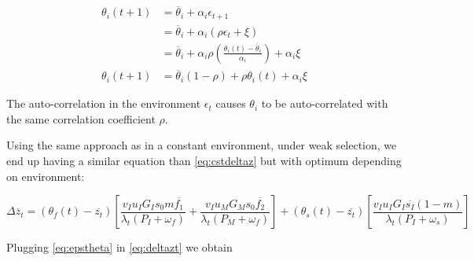 \begin{align}
	\theta_{i}(t+1) &= \overline{\theta}_{i} + \alpha_{i}\epsilon_{t+1} \nonumber \\
	&= \overline{\theta}_{i} + \alpha_{i}(\rho\epsilon_{t} + \xi) \nonumber \\
	&= \overline{\theta}_{i} + \alpha_{i}\rho(\frac{\theta_{i}(t)-\overline{\theta}_{i}}{\alpha_{i}}) + \alpha_{i}\xi \nonumber \\
	\label{eq:thetait}
	\theta_{i}(t+1) &= \overline{\theta}_{i}(1-\rho) + \rho\theta_{i}(t) + \alpha_{i}\xi
\end{align}

The auto-correlation in the environment $\epsilon_{t}$ causes $\theta_{i}$ to be auto-correlated with the same correlation coefficient $\rho$.

Using the same approach as in a constant environment, under weak selection, we end up having a similar equation than \eqref{eq:cstdeltaz} but with optimum depending on environment:

\begin{equation}
	\label{eq:deltazt}
	\Delta\overline{z}_{t} = 
		(\theta_{f}(t) - \overline{z_{t}})
		\left[ \frac{ v_{I} u_{I} G_{I} s_{0} m \overline{f_{1}} }{ \lambda_{t} (P_{I}+\omega_{f}) }
			+ \frac{ v_{I} u_{M} G_{M} s_{0} \overline{f_{2}} }{ \lambda_{t} (P_{M} + \omega_{f}) }
		\right]
		+ (\theta_{s}(t) - \overline{z_{t}})
		\left[ \frac{ v_{I} u_{I} G_{I} \overline{s_{I}} (1-m) }{ \lambda_{t} (P_{I}+\omega_{s}) }
		\right]
\end{equation}

Plugging \eqref{eq:epstheta} in \eqref{eq:deltazt} we obtain


